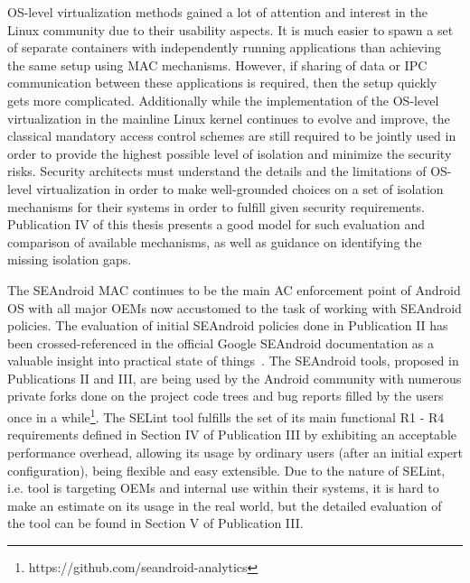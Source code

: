 OS-level virtualization methods gained a lot of attention and interest in the Linux community due to their usability aspects. It is much easier to spawn a set of separate containers with independently running applications than achieving the same setup using MAC mechanisms. However, if sharing of data or IPC communication between these applications is required, then the setup quickly gets more complicated. Additionally while the implementation of the OS-level virtualization in the mainline Linux kernel continues to evolve and improve, the classical mandatory access control schemes are still required to be jointly used in order to provide the highest possible level of isolation and minimize the security risks. Security architects must understand the details and the limitations of OS-level virtualization in order to make well-grounded choices on a set of isolation mechanisms for their systems in order to fulfill given security requirements. Publication IV of this thesis presents a good model for such evaluation and comparison of available mechanisms, as well as guidance on identifying the missing isolation gaps. 

The SEAndroid MAC continues to be the main AC enforcement point of Android OS with all major OEMs now accustomed to the task of working with SEAndroid policies. The evaluation of initial SEAndroid policies done in Publication II has been crossed-referenced in the official Google SEAndroid documentation as a valuable insight into practical state of things~\cite{seanroidsize}. The SEAndroid tools, proposed in Publications II and III, are being used by the Android community with numerous private forks done on the project code trees and bug reports filled by the users once in a while\footnote{https://github.com/seandroid-analytics}. The SELint tool fulfills the set of its main functional R1 - R4 requirements defined in Section IV of Publication III by exhibiting an acceptable performance overhead, allowing its usage by ordinary users (after an initial expert configuration), being flexible and easy extensible. Due to the nature of SELint, i.e. tool is targeting OEMs and internal use within their systems, it is hard to make an estimate on its usage in the real world, but the detailed evaluation of the tool can be found in Section V of Publication III. 

